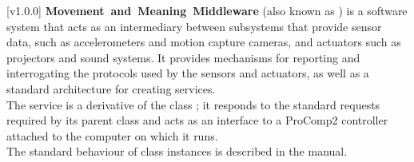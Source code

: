 [v1.0.0]
\textbf{Movement~and~Meaning~Middleware} (also known as \mplusm{}) is a software system
that acts as an intermediary between subsystems that provide sensor data, such as
accelerometers and motion capture cameras, and actuators such as projectors and sound
systems.
It provides mechanisms for reporting and interrogating the protocols used by the sensors
and actuators, as well as a standard architecture for creating services.\\

The \PCtwoI{} service is a derivative of the \mplusm{} class ;
it responds to the standard requests required by its parent class and acts as an interface
to a ProComp2 controller attached to the computer on which it runs.\\

The standard behaviour of  class instances is described in
the \emph{\MMM} manual.
\primaryEnd{}
